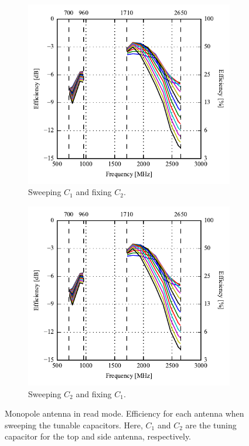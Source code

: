 \begin{figure}[htbp]
    \centering
    \begin{subfigure}{0.49\linewidth}
        \includegraphics{img/tech_sol/monopole/read_mode/efficiency-ac1-csh1}
        \caption{Sweeping $C_1$ and fixing $C_2$.}
    \end{subfigure}
    \hfill
    \begin{subfigure}{0.49\linewidth}
        \includegraphics{img/tech_sol/monopole/read_mode/efficiency-ac1-csh1}
        \caption{Sweeping $C_2$ and fixing $C_1$.}
    \end{subfigure}
    \caption{Monopole antenna in read mode. Efficiency for each antenna when sweeping the tunable capacitors. Here, $C_1$ and $C_2$ are the tuning capacitor for the top and side antenna, respectively.}
    \label{fig:corr_sols_read}
\end{figure}

